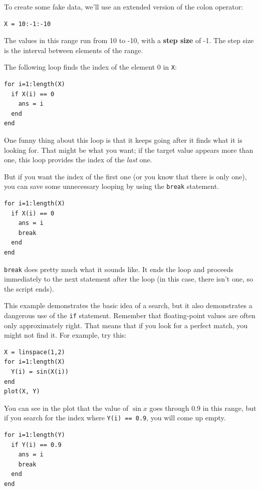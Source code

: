 \documentclass{book}
\begin{document}
To create some fake data, we'll use an extended version of the
colon operator:

\begin{verbatim}
X = 10:-1:-10
\end{verbatim}

The values in this range run from 10 to -10, with a {\bf step size}
of -1. The step size is the interval between elements of the range.

The following loop finds the index of the element 0 in {\tt X}:

\begin{verbatim}
for i=1:length(X)
  if X(i) == 0
    ans = i
  end
end
\end{verbatim}
 
One funny thing about this loop is that it keeps going after it
finds what it is looking for. That might be what you want; if the
target value appears more than one, this loop provides the index
of the {\em last} one.

But if you want the index of the first one (or you know that there
is only one), you can save some unnecessary looping by using the
{\tt break} statement.

\begin{verbatim}
for i=1:length(X)
  if X(i) == 0
    ans = i
    break
  end
end
\end{verbatim}

{\tt break} does pretty much what it sounds like. It ends the
loop and proceeds immediately to the next statement after the
loop (in this case, there isn't one, so the script ends).

This example demonstrates the basic idea of a search, but it
also demonstrates a dangerous use of the {\tt if} statement.
Remember that floating-point values are often only approximately
right. That means that if you look for a perfect match, you might
not find it. For example, try this:

\begin{verbatim}
X = linspace(1,2)
for i=1:length(X)
  Y(i) = sin(X(i))
end
plot(X, Y)
\end{verbatim}

You can see in the plot that the value of $\sin x$ goes through
0.9 in this range, but if you search for the index where
{\tt Y(i) == 0.9}, you will come up empty.

\begin{verbatim}
for i=1:length(Y)
  if Y(i) == 0.9
    ans = i
    break
  end
end
\end{verbatim}
\end{document}
